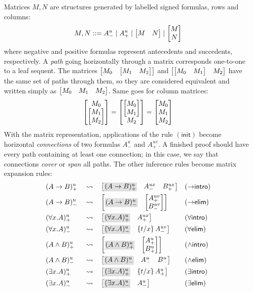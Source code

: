 \documentclass[twoside]{report}
\begin{document}
Matrices $M, N$ are structures generated by labelled signed formulas, rows and columns:
$$
    M, N ::= A^u_- \mid A^u_+ \mid \begin{bmatrix}M & N\end{bmatrix} \mid \begin{bmatrix}M \\ N\end{bmatrix}
$$
where negative and positive formulas represent antecedents and succedents, respectively. A \emph{path} going horizontally through a matrix corresponds one-to-one to a leaf sequent. The matrices $\begin{bmatrix}M_0 & \begin{bmatrix}M_1 & M_2\end{bmatrix}\end{bmatrix}$ and $\begin{bmatrix}\begin{bmatrix}M_0 & M_1\end{bmatrix} & M_2\end{bmatrix}$ have the same set of paths through them, so they are considered equivalent and written simply as $\begin{bmatrix}M_0 & M_1 & M_2\end{bmatrix}$. Same goes for column matrices:
$$
    \begin{bmatrix}M_0 \\ \begin{bmatrix}M_1 \\ M_2\end{bmatrix}\end{bmatrix} = \begin{bmatrix}\begin{bmatrix}M_0 \\ M_1\end{bmatrix} \\ M_2\end{bmatrix} = \begin{bmatrix}M_0 \\ M_1 \\ M_2\end{bmatrix}
$$
With the matrix representation, applications of the rule $(\mathsf{init})$ become horizontal \emph{connections} of two formulas $A^u_-$ and $A^{uv}_+$. A finished proof should have every path containing at least one connection; in this case, we say that connections \emph{cover} or \emph{span} all paths. The other inference rules become matrix expansion rules:
$$
    \begin{aligned}
         & (A \to B)^u_+      &  & \rightsquigarrow &  & \mat{\shade{(A \to B)^u_+} & A^{ux}_- & B^{ux}_+}        &  & ({\to}\mathsf{intro})     \\
         & (A \to B)^u_-      &  & \rightsquigarrow &  & \mat{\shade{(A \to B)^u_-} & \mat{A^{uv}_+ \\ B^{uv}_-}} &  & ({\to}\mathsf{elim})      \\
         & (\forall x. A)^u_+ &  & \rightsquigarrow &  & \mat{\shade{(\forall x. A)^u_+} & A^{ux}_+}              &  & ({\forall}\mathsf{intro}) \\
         & (\forall x. A)^u_- &  & \rightsquigarrow &  & \mat{\shade{(\forall x. A)^u_-} & \subst x t {A^{uv}_-}} &  & ({\forall}\mathsf{elim})  \\
         & (A \land B)^u_+    &  & \rightsquigarrow &  & \mat{\shade{(A \land B)^u_+} & \mat{A^u_+ \\ B^u_+}}     &  & ({\land}\mathsf{intro})   \\
         & (A \land B)^u_-    &  & \rightsquigarrow &  & \mat{\shade{(A \land B)^u_-} & A^u_- & B^u_-}            &  & ({\land}\mathsf{elim})    \\
         & (\exists x. A)^u_+ &  & \rightsquigarrow &  & \mat{\shade{(\exists x. A)^u_+} & \subst x t {A^u_+}}    &  & ({\exists}\mathsf{intro}) \\
         & (\exists x. A)^u_- &  & \rightsquigarrow &  & \mat{\shade{(\exists x. A)^u_-} & A^u_-}                 &  & ({\exists}\mathsf{elim})  \\
    \end{aligned}
$$
\end{document}
